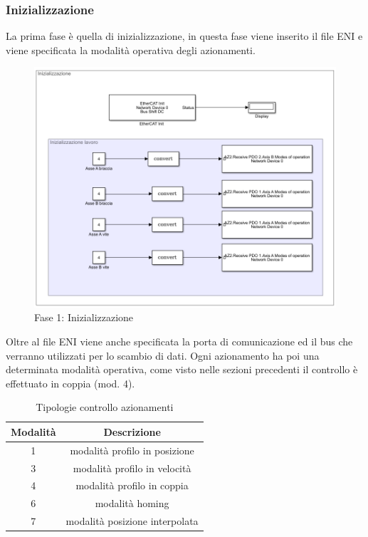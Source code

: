 \subsubsection*{Inizializzazione}
La prima fase è quella di inizializzazione, in questa fase viene inserito il file ENI e viene specificata la modalità operativa degli azionamenti.
\begin{figure}[ht]
	\begin{center}
		\includegraphics[scale=0.63]{Immagini/Sperimentale/Inizializzazione}
		\caption{Fase 1: Inizializzazione}
		\label{fig:Init}
	\end{center}
\end{figure}
Oltre al file ENI viene anche specificata la porta di comunicazione ed il bus che verranno utilizzati per lo scambio di dati. Ogni azionamento ha poi una determinata modalità operativa, come visto nelle sezioni precedenti il controllo è effettuato in coppia (mod. 4). 
\begin{table}[h!]
	\centering
	\begin{tabular}{|c |c|} 
		\hline
		Modalità & Descrizione  \\ 
		\hline
		1 & modalità profilo in posizione  \\ 
		3 & modalità profilo in velocità  \\
		4 & modalità profilo in coppia   \\
		6 & modalità homing \\
		7 & modalità posizione interpolata\\
		\hline
	\end{tabular}
	\caption{Tipologie controllo azionamenti}
	\label{table:5}
\end{table}
